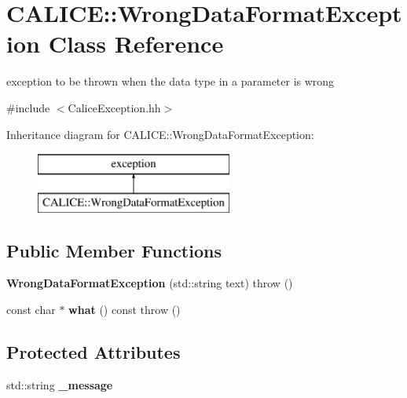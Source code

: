 \section{C\-A\-L\-I\-C\-E\-:\-:Wrong\-Data\-Format\-Exception Class Reference}
\label{classCALICE_1_1WrongDataFormatException}


exception to be thrown when the data type in a parameter is wrong  




{\ttfamily \#include $<$Calice\-Exception.\-hh$>$}

Inheritance diagram for C\-A\-L\-I\-C\-E\-:\-:Wrong\-Data\-Format\-Exception\-:\begin{figure}[H]
\begin{center}
\leavevmode
\includegraphics[height=2.000000cm]{classCALICE_1_1WrongDataFormatException}
\end{center}
\end{figure}
\subsection*{Public Member Functions}
\begin{DoxyCompactItemize}
\item 
{\bfseries Wrong\-Data\-Format\-Exception} (std\-::string text)  throw ()\label{classCALICE_1_1WrongDataFormatException_a969132915151f6d413bb410a33ad350b}

\item 
const char $\ast$ {\bfseries what} () const   throw ()\label{classCALICE_1_1WrongDataFormatException_a5a7c6e2b27deef9c9afecfbcc532db28}

\end{DoxyCompactItemize}
\subsection*{Protected Attributes}
\begin{DoxyCompactItemize}
\item 
std\-::string {\bfseries \-\_\-message}\label{classCALICE_1_1WrongDataFormatException_afe8c376d76c4d8e987dc5f94736eaacf}

\end{DoxyCompactItemize}


